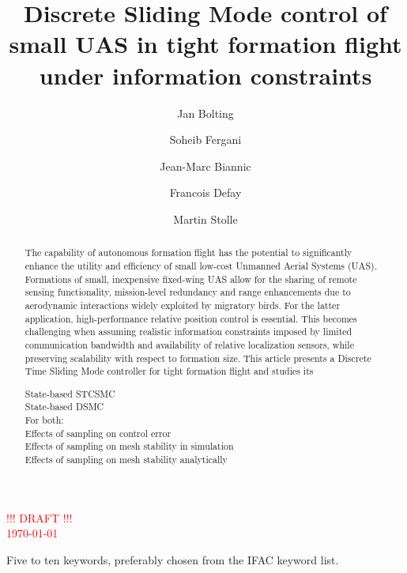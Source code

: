 \documentclass{ifacconf}
\begin{document}
\begin{frontmatter}

\title{Discrete Sliding Mode control of small UAS in tight formation flight under information constraints} 

\author[First]{Jan Bolting} 
\author[Second]{Soheib Fergani} 
\author[Third]{Jean-Marc Biannic}
\author[Fourth]{Francois Defay}
\author[Fifth]{Martin Stolle}

\address[First]{National Institute of Standards and Technology, 
   Boulder, CO 80305 USA (e-mail: author@ boulder.nist.gov).}
\address[Second]{Colorado State University, 
   Fort Collins, CO 80523 USA (e-mail: author@lamar. colostate.edu)}
\address[Third]{Electrical Engineering Department, 
   Seoul National University, Seoul, Korea, (e-mail: author@snu.ac.kr)}

\textcolor{red}{\Huge !!! DRAFT !!!\\ \normalsize \today \\ \currenttime}

\begin{abstract}     
The capability of autonomous formation flight has the potential to significantly enhance the utility and efficiency of small low-cost Unmanned Aerial Systems (UAS). Formations of small, inexpensive fixed-wing UAS allow for the sharing of remote sensing functionality, mission-level redundancy and range enhancements due to aerodynamic interactions widely exploited by migratory birds. 
For the latter application, high-performance relative position control is essential.
This becomes challenging when assuming realistic information constraints imposed by limited communication bandwidth and availability of relative localization sensors,  while preserving scalability with respect to formation size. 
This article presents a Discrete Time Sliding Mode controller for tight formation flight and studies its

State-based STCSMC\\
State-based DSMC\\
For both:\\
Effects of sampling on control error\\
Effects of sampling on mesh stability in simulation\\
Effects of sampling on mesh stability analytically
\end{abstract}

\begin{keyword}
Five to ten keywords, preferably chosen from the IFAC keyword list.
\end{keyword}

\end{frontmatter}
\end{document}
